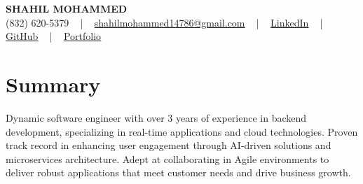 \documentclass[letterpaper,10pt]{article}
\begin{document}
\begin{center}
    {\fontsize{14pt}{12pt}\selectfont \textbf{\MakeUppercase{Shahil Mohammed}}}\\ \vspace{2pt}
    \fontsize{10pt}{12pt}\selectfont (832) 620-5379 ~ | ~ \href{mailto:shahilmohammed14786@gmail.com}{shahilmohammed14786@gmail.com} ~ | ~  
    \href{https://www.linkedin.com/in/shahil-mohammed-9652931a1/}{\color{blue}\underline{LinkedIn}}  ~ | ~ 
    \href{https://github.com/freakbeast14}{\color{blue}\underline{GitHub}} ~ | ~ 
    \href{https://shahil-mohammed.netlify.app/}{\color{blue}\underline{Portfolio}}
    \vspace{-8pt}
\end{center}

\section{Summary}
\vspace{-2pt}\fontsize{8pt}{9pt}\selectfont
Dynamic software engineer with over 3 years of experience in backend development, specializing in real-time applications and cloud technologies. Proven track record in enhancing user engagement through AI-driven solutions and microservices architecture. Adept at collaborating in Agile environments to deliver robust applications that meet customer needs and drive business growth.
 \vspace{-5pt}
 
\vspace{-2pt}
\end{document}
